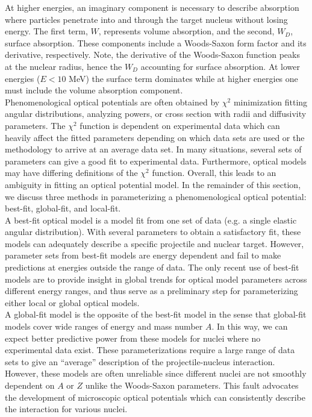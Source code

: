 \documentclass[preprintnumbers,floatfix,aps,prc,preprint,nofootinbib]{revtex4-1}
\begin{document}
At higher energies, an imaginary component is necessary to describe absorption where particles penetrate into and through the target nucleus without losing energy. The first term, $W$, represents volume absorption, and the second, $W_D$, surface absorption. These components include a Woods-Saxon form factor and its derivative, respectively. Note, the derivative of the Woods-Saxon function peaks at the nuclear radius, hence the $W_D$ accounting for surface absorption. At lower energies ($E < 10$ MeV) the surface term dominates while at higher energies one must include the volume absorption component.
\\

Phenomenological optical potentials are often obtained by $\chi^2$ minimization fitting angular distributions, analyzing powers, or cross section with radii and diffusivity parameters. The $\chi^2$ function is dependent on experimental data which can heavily affect the fitted parameters depending on which data sets are used or the methodology to arrive at an average data set. In many situations, several sets of parameters can give a good fit to experimental data. Furthermore, optical models may have differing definitions of the $\chi^2$ function. Overall, this leads to an ambiguity in fitting an optical potential model. In the remainder of this section, we discuss three methods in parameterizing a phenomenological optical potential: best-fit, global-fit, and local-fit.
\\

A best-fit optical model is a model fit from one set of data (e.g. a single elastic angular distribution). With several parameters to obtain a satisfactory fit, these models can adequately describe a specific projectile and nuclear target. However, parameter sets from best-fit models are energy dependent and fail to make predictions at energies outside the range of data. The only recent use of best-fit models are to provide insight in global trends for optical model parameters across different energy ranges, and thus serve as a preliminary step for parameterizing either local or global optical models.
\\

A global-fit model is the opposite of the best-fit model in the sense that global-fit models cover wide ranges of energy and mass number $A$. In this way, we can expect better predictive power from these models for nuclei where no experimental data exist. These parameterizations require a large range of data sets to give an ``average'' description of the projectile-nucleus interaction. However, these models are often unreliable since different nuclei are not smoothly dependent on $A$ or $Z$ unlike the Woods-Saxon parameters. This fault advocates the development of microscopic optical potentials which can consistently describe the interaction for various nuclei.
\\
\end{document}
